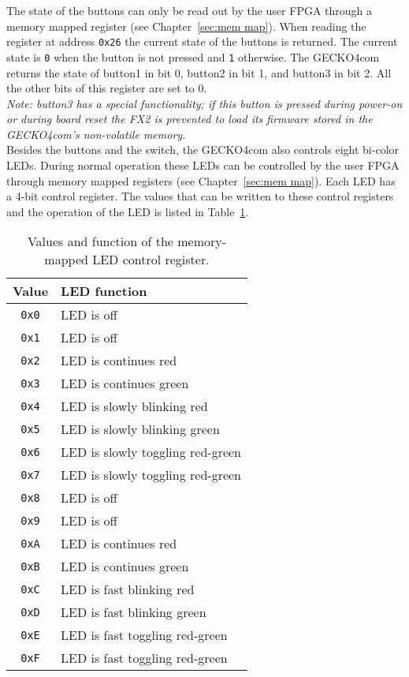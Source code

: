 The state of the buttons can only be read out by the user FPGA through a memory 
mapped register (see Chapter~\ref{sec:mem map}). When reading the register at
address \verb+0x26+ the current state of the buttons is returned. The current
state is \verb+0+ when the button is not pressed and \verb+1+ otherwise. The
{\sc GECKO4com} returns the state of {\sc button1} in bit 0, {\sc button2} in
bit 1, and {\sc button3} in bit 2. All the other bits of this register are set
to 0.\\
\textit{Note: {\sc button3} has a special functionality; if this button is
pressed during power-on or during board reset the FX2 is prevented to load its
firmware stored in the {\sc GECKO4com}'s non-volatile memory.}\\

Besides the buttons and the switch, the {\sc GECKO4com} also controls eight
bi-color LEDs. During normal operation these LEDs can be controlled by the user
FPGA through memory mapped registers (see Chapter~\ref{sec:mem map}). Each LED
has a 4-bit control register. The values that can be written to these control
registers and the operation of the LED is listed in Table~\ref{tab:led cntrl}.
\begin{table}[t]
\centering%
\begin{tabular}{|c|l|}
\hline
\textbf{Value}&\textbf{LED function}\\
\hline
\hline
\verb+0x0+&LED is off\\
\hline
\verb+0x1+&LED is off\\
\hline
\verb+0x2+&LED is continues red\\
\hline
\verb+0x3+&LED is continues green\\
\hline
\verb+0x4+&LED is slowly blinking red\\
\hline
\verb+0x5+&LED is slowly blinking green\\
\hline
\verb+0x6+&LED is slowly toggling red-green\\
\hline
\verb+0x7+&LED is slowly toggling red-green\\
\hline
\verb+0x8+&LED is off\\
\hline
\verb+0x9+&LED is off\\
\hline
\verb+0xA+&LED is continues red\\
\hline
\verb+0xB+&LED is continues green\\
\hline
\verb+0xC+&LED is fast blinking red\\
\hline
\verb+0xD+&LED is fast blinking green\\
\hline
\verb+0xE+&LED is fast toggling red-green\\
\hline
\verb+0xF+&LED is fast toggling red-green\\
\hline
\end{tabular}
\caption{Values and function of the memory-mapped LED control register.}
\label{tab:led cntrl}
\end{table}
